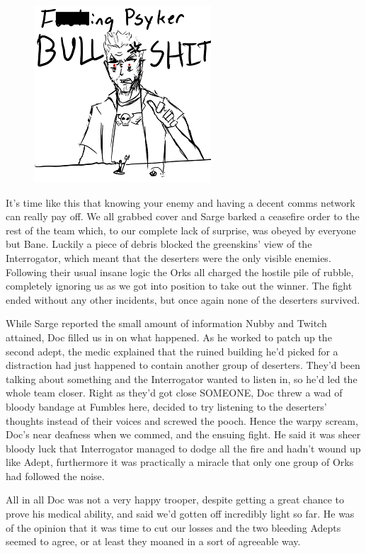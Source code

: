 \begin{figure}
	\begin{center}
		\includegraphics[width=\figwidth]{pics/9/20.png}
	\end{center}
\end{figure}
It's time like this that knowing your enemy and having a decent comms network can really pay off. 
We all grabbed cover and Sarge barked a ceasefire order to the rest of the team which, to our complete lack of surprise, was obeyed by everyone but Bane. 
Luckily a piece of debris blocked the greenskins' view of the Interrogator, which meant that the deserters were the only visible enemies. 
Following their usual insane logic the Orks all charged the hostile pile of rubble, completely ignoring us as we got into position to take out the winner. 
The fight ended without any other incidents, but once again none of the deserters survived.

While Sarge reported the small amount of information Nubby and Twitch attained, Doc filled us in on what happened. 
As he worked to patch up the second adept, the medic explained that the ruined building he'd picked for a distraction had just happened to contain another group of deserters. 
They'd been talking about something and the Interrogator wanted to listen in, so he'd led the whole team closer. 
Right as they'd got close SOMEONE, Doc threw a wad of bloody bandage at Fumbles here, decided to try listening to the deserters' thoughts instead of their voices and screwed the pooch. 
Hence the warpy scream, Doc's near deafness when we commed, and the ensuing fight. 
He said it was sheer bloody luck that Interrogator managed to dodge all the fire and hadn't wound up like Adept, furthermore it was practically a miracle that only one group of Orks had followed the noise.

All in all Doc was not a very happy trooper, despite getting a great chance to prove his medical ability, and said we'd gotten off incredibly light so far. 
He was of the opinion that it was time to cut our losses and the two bleeding Adepts seemed to agree, or at least they moaned in a sort of agreeable way.

